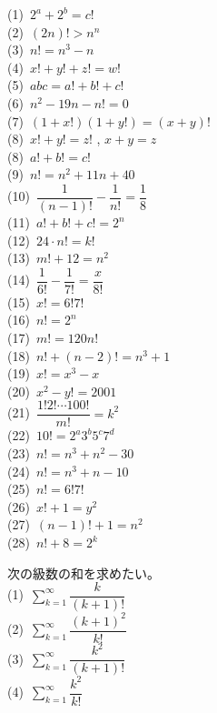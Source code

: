 \documentclass[11pt]{article}
\begin{document}
\begin{tcolorbox}[mybox={(SyberMath) \  Factorial}]
(1)\ $2^a +2^b = c!$ \\
(2)\ $(2n)! > n^n$\\
(3)\ $n!=n^3 -n$\\
(4)\ $x!+y!+z!=w!$\\
(5)\ $abc=a!+b!+c!$\\
(6)\ $n^2 -19n-n!=0$\\
(7)\ $(1+x!)(1+y!)=(x+y)!$\\
(8)\ $x!+y!=z!$ , $x+y=z$\\
(8)\ $a!+b!=c!$\\
(9)\ $n!=n^2 +11n+40$\\
(10)\ $\dfrac{1}{(n-1)!} -\dfrac{1}{n!} = \dfrac{1}{8}$\\
(11)\ $a!+b!+c!=2^n$\\
(12)\ $24 \cdot n!=k!$\\
(13)\ $m!+12=n^2$\\
(14)\ $\dfrac{1}{6!} -\dfrac{1}{7!} = \dfrac{x}{8!}$\\
(15)\ $x!=6!7!$\\
(16)\ $n!=2^n$\\
(17)\ $m!=120n!$\\
(18)\ $n!+(n-2)!=n^3 +1$\\
(19)\ $x!=x^3-x$\\
(20)\ $x^2 -y!=2001$\\
(21)\ $\dfrac{1!2! \cdots 100!}{m!}=k^2$\\
(22)\ $10!=2^a 3^b 5^c 7^d$\\
(23)\ $n!=n^3 + n^2 -30$\\
(24)\ $n!=n^3 + n -10$\\
(25)\ $n!=6!7!$\\
(26)\ $x!+1=y^2$\\
(27)\ $(n-1)!+1=n^2$\\
(28)\ $n!+8=2^k$
\end{tcolorbox}

\begin{tcolorbox}[mybox={(SyberMath) Factorial and series}]
次の級数の和を求めたい。\\
(1)\ $\displaystyle \sum_{k=1}^{\infty} \dfrac{k}{(k+1)!}$\\
(2)\ $\displaystyle \sum_{k=1}^{\infty} \dfrac{(k+1)^2}{k!}$\\
(3)\ $\displaystyle \sum_{k=1}^{\infty} \dfrac{k^2}{(k+1)!}$\\
(4)\ $\displaystyle \sum_{k=1}^{\infty} \dfrac{k^2}{k!}$
\end{tcolorbox}
\end{document}
